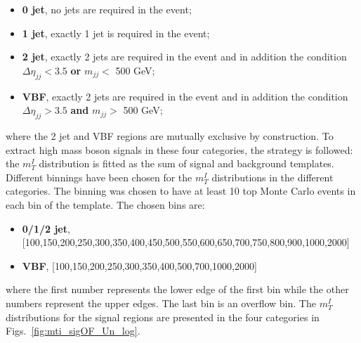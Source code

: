 \begin{itemize}
\item {\bf 0 jet}, no jets are required in the event;
\item {\bf 1 jet}, exactly 1 jet is required in the event;
\item {\bf 2 jet}, exactly 2 jets are required in the event and in addition the condition $\Delta \eta_{jj} < 3.5$ {\bf or} $m_{jj} <$ 500 GeV;
\item {\bf VBF}, exactly 2 jets are required in the event and in addition the condition $\Delta \eta_{jj} > 3.5$ {\bf and} $m_{jj} >$ 500 GeV;
\end{itemize}
where the 2 jet and VBF regions are mutually exclusive by construction.
To extract high mass boson signals in these four categories, the  strategy  is followed: the $m_T^I$ distribution is fitted as the sum of
signal and background templates. Different binnings have been chosen for the  $m_T^I$ distributions in the
different categories. The binning was chosen to have  at least 10
top Monte Carlo events in each bin of the template. The chosen bins are: 
\begin{itemize}
\item  {\bf 0/1/2 jet}, [100,150,200,250,300,350,400,450,500,550,600,650,700,750,800,900,1000,2000]
\item {\bf VBF}, [100,150,200,250,300,350,400,500,700,1000,2000]
\end{itemize}
where the first number represents the lower edge of the first bin while the other numbers represent the upper edges. The last bin is an overflow bin.
The  $m_T^I$ distributions for the signal regions are presented in the four categories in Figs.~\ref{fig:mti_sigOF_Un_log}.

